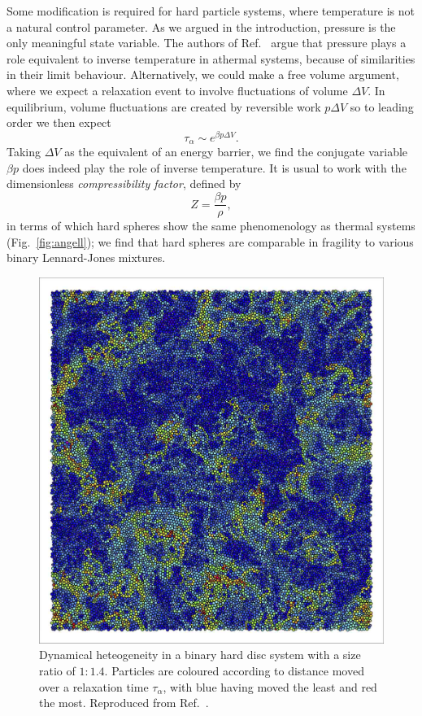 \documentclass[11pt,twoside]{report}
\begin{document}
Some modification is required for hard particle systems, where temperature is not a natural control parameter.
As we argued in the introduction, pressure is the only meaningful state variable.
The authors of Ref.\ \cite{BerthierPRE2009} argue that pressure plays a role equivalent to inverse temperature in athermal systems, because of similarities in their limit behaviour.
Alternatively, we could make a free volume argument, where we expect a relaxation event to involve fluctuations of volume $\Delta V$.
In equilibrium, volume fluctuations are created by reversible work $p \Delta V$ so to leading order%
we then expect
\begin{equation*}
  \tau_\alpha \sim e^{\beta p \Delta V}.
\end{equation*}
Taking $\Delta V$ as the equivalent of an energy barrier, we find the conjugate variable $\beta p$ does indeed play the role of inverse temperature.
It is usual to work with the dimensionless \emph{compressibility factor}, defined by
\begin{equation}
  Z = \frac{\beta p}{\rho},
\end{equation}
in terms of which hard spheres show the same phenomenology as thermal systems (Fig.\ \ref{fig:angell}); we find that hard spheres are comparable in fragility to various binary Lennard-Jones mixtures.

\begin{figure}
  \includegraphics[width=0.7\linewidth,outer]{dynamic-heterogeneity}
  \caption[Dynamical heterogeneity in binary hard discs]{
    Dynamical heteogeneity in a binary hard disc system with a size ratio of $1:1.4$.
    Particles are coloured according to distance moved over a relaxation time $\tau_\alpha$, with blue having moved the least and red the most.
    Reproduced from Ref.\ \cite{RoyallPR2015}.
  }
  \label{fig:dynamic-heterogeneities}
\end{figure}
\end{document}
